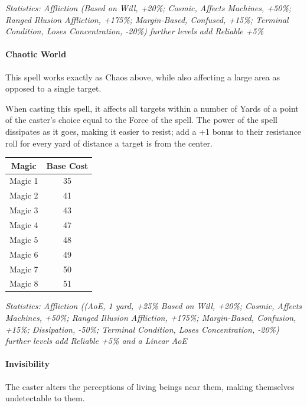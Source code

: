 \begin{multicols*}{3}
	\textcolor{OliveGreen}{\textit{Statistics: Affliction (Based on Will, +20\%; Cosmic, Affects Machines, +50\%; Ranged Illusion Affliction, +175\%; Margin-Based, Confused, +15\%; Terminal Condition, Loses Concentration, -20\%)  further levels add Reliable +5\%}}
	
	\paragraph{Chaotic World}
	
	This spell works exactly as Chaos above, while also affecting a large area as opposed to a single target.
	
	When casting this spell, it affects all targets within a number of Yards of a point of the caster's choice equal to the Force of the spell. The power of the spell dissipates as it goes, making it easier to resist; add a +1 bonus to their resistance roll for every yard of distance a target is from the center.
	
	\begin{center}
		\begin{tabular}{|c|c|}
			\hline
			Magic & Base Cost \\
			\hline
			\hline
			Magic 1 & 35 \\
			Magic 2 & 41 \\
			Magic 3 & 43 \\
			Magic 4 & 47 \\
			Magic 5 & 48 \\
			Magic 6 & 49 \\
			Magic 7 & 50 \\
			Magic 8 & 51 \\
			\hline
		\end{tabular}
	\end{center}
	
	\textcolor{OliveGreen}{\textit{Statistics: Affliction ((AoE, 1 yard, +25\% Based on Will, +20\%; Cosmic, Affects Machines, +50\%; Ranged Illusion Affliction, +175\%; Margin-Based, Confusion, +15\%; Dissipation, -50\%; Terminal Condition, Loses Concentration, -20\%)  further levels add Reliable +5\% and a Linear AoE}}
		
	\paragraph{Invisibility}
	
	The caster alters the perceptions of living beings near them, making themselves undetectable to them.
	

\end{multicols*}
